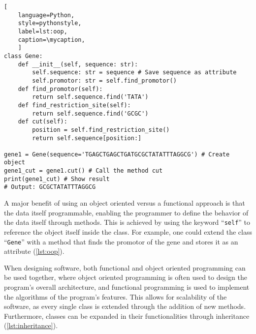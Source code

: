 \def\mycaption{ Example of object oriented programming in python. The class is
    called ``\texttt{Gene}'' and has four methods, ``\texttt{\_\_init\_\_}'',
    ``\texttt{find\_promotor}'', ``\texttt{find\_restriction\_site}'' and
    ``\texttt{cut}''. The function ``\texttt{\_\_init\_\_}'' is called when
    creating (``initializing'') an object, which fills the object with
    user-defined data. The parameter ``\texttt{self}'' is used to reference the
    object itself internally. ``\texttt{find\_promotor}'' is a
    method that finds the position of the promotor in the gene and is called
    during object initialization. }
\begin{lstlisting}[
    language=Python,
    style=pythonstyle,
    label=lst:oop,
    caption=\mycaption,
    ]
class Gene:
    def __init__(self, sequence: str):
        self.sequence: str = sequence # Save sequence as attribute
        self.promotor: str = self.find_promotor() 
    def find_promotor(self):
        return self.sequence.find('TATA')
    def find_restriction_site(self):
        return self.sequence.find('GCGC')
    def cut(self):
        position = self.find_restriction_site()
        return self.sequence[position:]

gene1 = Gene(sequence='TGAGCTGAGCTGATGCGCTATATTTAGGCG') # Create object
gene1_cut = gene1.cut() # Call the method cut
print(gene1_cut) # Show result
# Output: GCGCTATATTTAGGCG
\end{lstlisting}

A major benefit of using an object oriented versus a functional approach is that
the data itself programmable, enabling the programmer to define the behavior of
the data itself through methods. This is achieved by using the keyword
``\texttt{self}'' to reference the object itself inside the class. For example,
one could extend the class ``\texttt{Gene}'' with a method that finds the
promotor of the gene and stores it as an attribute (\autoref{lst:oop}).

When designing software, both functional and object oriented programming can be
used together, where object oriented programming is often used to design the
program's overall architecture, and functional programming is used to implement
the algorithms of the program's features. This allows for scalability of the
software, as every single class is extended through the addition of new methods.
Furthermore, classes can be expanded in their functionalities through
inheritance (\autoref{lst:inheritance}).


